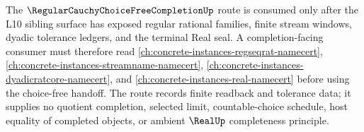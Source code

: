 The $\RegularCauchyChoiceFreeCompletionUp$ route is consumed only after the L10 sibling surface has exposed regular rational families, finite stream windows, dyadic tolerance ledgers, and the terminal Real seal. A completion-facing consumer must therefore read \autoref{ch:concrete-instances-regseqrat-namecert}, \autoref{ch:concrete-instances-streamname-namecert}, \autoref{ch:concrete-instances-dyadicratcore-namecert}, and \autoref{ch:concrete-instances-real-namecert} before using the choice-free handoff. The route records finite readback and tolerance data; it supplies no quotient completion, selected limit, countable-choice schedule, host equality of completed objects, or ambient $\RealUp$ completeness principle.
